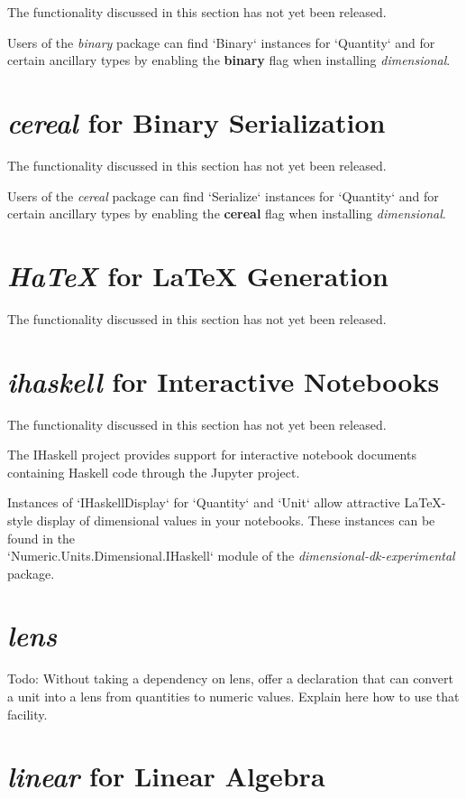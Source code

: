 \documentclass[11pt]{report}
\newcommand{\packagename}[1]{\textit{#1}}
\newcommand{\thispackage}{\packagename{dimensional}}
\newcommand{\experimentalpackage}{\packagename{dimensional-dk-experimental}}
\newcommand{\submodule}[1]{`Numeric.Units.Dimensional.{#1}`}
\newcommand{\flag}[1]{\textbf{#1}}
\newcommand{\prerelease}{\begin{framed}
The functionality discussed in this section has not yet been released.
\end{framed}}
\begin{document}
\prerelease{}

Users of the \packagename{binary} package can find `Binary`
instances for `Quantity` and for certain ancillary types by
enabling the \flag{binary} flag when installing \thispackage{}.

\section{\packagename{cereal} for Binary Serialization}

\prerelease{}

Users of the \packagename{cereal} package can find `Serialize`
instances for `Quantity` and for certain ancillary types by
enabling the \flag{cereal} flag when installing \thispackage{}.

\section{\packagename{HaTeX} for \LaTeX{} Generation}

\prerelease{}

\section{\packagename{ihaskell} for Interactive Notebooks}

\prerelease{}

The IHaskell project provides support for interactive notebook documents containing
Haskell code through the Jupyter project.

Instances of `IHaskellDisplay` for `Quantity` and `Unit`
allow attractive \LaTeX{}-style display of dimensional values in your notebooks. These
instances can be found in the \\
\submodule{IHaskell} module of the \experimentalpackage{}
package.

\section{\packagename{lens}}

Todo: Without taking a dependency on lens, offer a declaration that can convert a unit into a lens from quantities to numeric values.
Explain here how to use that facility.

\section{\packagename{linear} for Linear Algebra}
\end{document}
